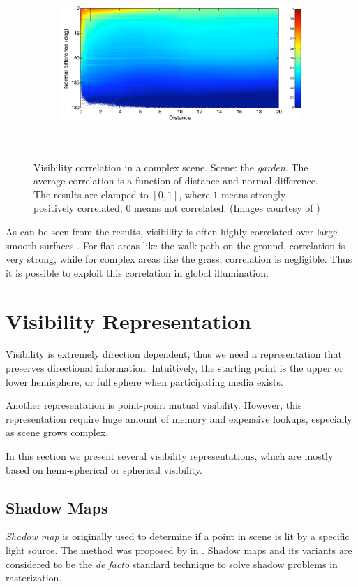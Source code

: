 \documentclass[]{book}
\begin{document}
\begin{figure}
	\begin{subfigure}{1.\textwidth}
		\centering
		\includegraphics[height=2.5in]{img/VC-2-correlate3.png}
	\end{subfigure}
	\caption[Visibility Correlation]{Visibility correlation in a complex scene. Scene: the \textit{garden}. The average correlation is a function of distance and normal difference. The results are clamped to $\left[ 0, 1\right]$, where $1$ means strongly positively correlated, $0$ means not correlated. (Images courtesy of \citeauthor{clarberg2008VisCorrelation})}
	\label{fig:VC:correlation}
\end{figure}

As can be seen from the results, visibility is often highly correlated over large smooth surfaces \cite{clarberg2008VisCorrelation}.
For flat areas like the walk path on the ground, correlation is very strong, while for complex areas like the grass, correlation is negligible.
Thus it is possible to exploit this correlation in global illumination.

\section{Visibility Representation}
\label{sec:VC:represent}
Visibility is extremely direction dependent, thus we need a representation that preserves directional information.
Intuitively, the starting point is the upper or lower hemisphere, or full sphere when participating media exists.

Another representation is point-point mutual visibility.
However, this representation require huge amount of memory and expensive lookups, especially as scene grows complex.

In this section we present several visibility representations, which are mostly based on hemi-spherical or spherical visibility.

\subsection{Shadow Maps}
\label{sec:VC:represent:SM}
\textit{Shadow map} is originally used to determine if a point in scene is lit by a specific light source.
The method was proposed by \citeauthor{williams1978SM} in \citeyear{williams1978SM} \cite{williams1978SM}.
Shadow maps and its variants are considered to be the \textit{de facto} standard technique to solve shadow problems in rasterization.
\end{document}
